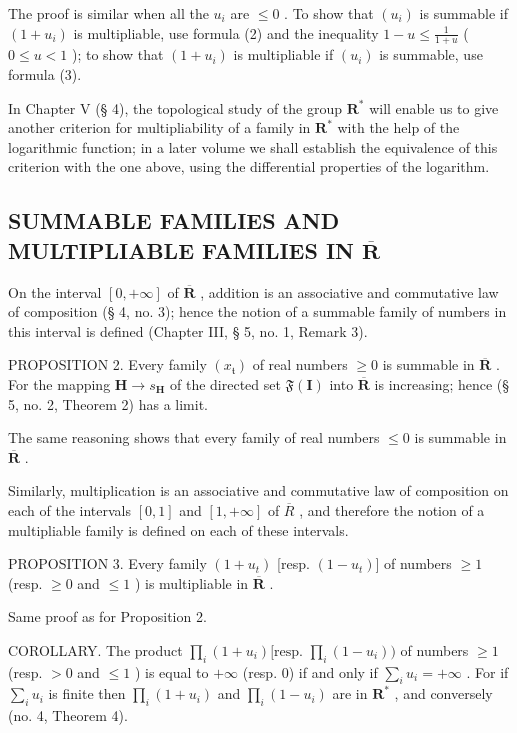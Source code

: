 The proof is similar when all the \(u_{i}\) are \(\leqslant 0\) . To show that \((u_{i})\) is summable if \((1 + u_{i})\) is multipliable, use formula (2) and the inequality \(1 - u \leqslant \frac{1}{1 + u}\) ( \(0 \leqslant u < 1\) ); to show that \((1 + u_{i})\) is multipliable if \((u_{i})\) is summable, use formula (3).

In Chapter V (§ 4), the topological study of the group \(\mathbf{R}^*\) will enable us to give another criterion for multipliability of a family in \(\mathbf{R}^*\) with the help of the logarithmic function; in a later volume we shall establish the equivalence of this criterion with the one above, using the differential properties of the logarithm.

\subsection{\texorpdfstring{SUMMABLE FAMILIES AND MULTIPLIABLE FAMILIES IN \(\overline{\mathbf{R}}\)}{SUMMABLE FAMILIES AND MULTIPLIABLE FAMILIES IN \textbackslash overline\{\textbackslash mathbf\{R\}\}}}

On the interval \([0, +\infty]\) of \(\overline{\mathbf{R}}\) , addition is an associative and commutative law of composition (§ 4, no. 3); hence the notion of a summable family of numbers in this interval is defined (Chapter III, § 5, no. 1, Remark 3).

PROPOSITION 2. Every family \((x_{\mathfrak{t}})\) of real numbers \(\geqslant 0\) is summable in \(\overline{\mathbf{R}}\) . For the mapping \(\mathbf{H} \to s_{\mathbf{H}}\) of the directed set \(\mathfrak{F}(\mathbf{I})\) into \(\overline{\mathbf{R}}\) is increasing; hence (§ 5, no. 2, Theorem 2) has a limit.

The same reasoning shows that every family of real numbers \(\leqslant 0\) is summable in \(\overline{\mathbf{R}}\) .

Similarly, multiplication is an associative and commutative law of composition on each of the intervals \([0, 1]\) and \([1, +\infty]\) of \(\overline{R}\) , and therefore the notion of a multipliable family is defined on each of these intervals.

PROPOSITION 3. Every family \((1 + u_{t})\) {[}resp. \((1 - u_{t})]\) of numbers \(\geqslant 1\) (resp. \(\geqslant 0\) and \(\leqslant 1\) ) is multipliable in \(\overline{\mathbf{R}}\) .

Same proof as for Proposition 2.

COROLLARY. The product \(\prod_{i} (1 + u_i) [\text{resp. } \prod_{i} (1 - u_i))\) of numbers \(\geqslant 1\) (resp. \(>0\) and \(\leqslant 1\) ) is equal to \(+\infty\) (resp. 0) if and only if \(\sum_{i} u_i = +\infty\) . For if \(\sum_{i} u_i\) is finite then \(\prod_{i} (1 + u_i)\) and \(\prod_{i} (1 - u_i)\) are in \(\mathbf{R}^*\) , and conversely (no. 4, Theorem 4).

